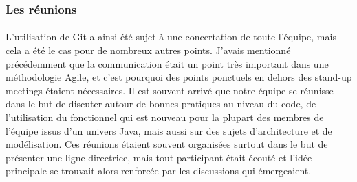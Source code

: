 \subsubsection{Les réunions}
\label{subs:Les réunions}
\paragraph{}
L'utilisation de Git a ainsi été sujet à une concertation de toute l'équipe, mais cela a été le cas pour de nombreux autres points.
J'avais mentionné précédemment que la communication était un point très important dans une méthodologie Agile, et c'est pourquoi des points ponctuels en dehors des stand-up meetings étaient nécessaires.
Il est souvent arrivé que notre équipe se réunisse dans le but de discuter autour de bonnes pratiques au niveau du code, de l'utilisation du fonctionnel qui est nouveau pour la plupart des membres de l'équipe issus d'un univers Java, mais aussi sur des sujets d'architecture et de modélisation.
Ces réunions étaient souvent organisées surtout dans le but de présenter une ligne directrice, mais tout participant était écouté et l'idée principale se trouvait alors renforcée par les discussions qui émergeaient.
